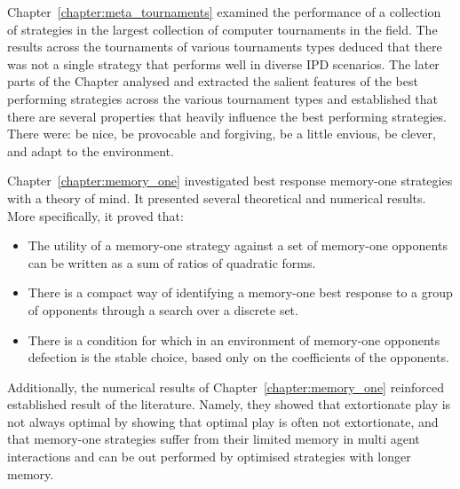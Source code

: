 Chapter~\ref{chapter:meta_tournaments} examined the performance of a collection
of \numberofstrategies strategies in the largest collection of computer
tournaments in the field. The results across the \numberofalltournaments
tournaments of various tournaments types deduced that there was not a single strategy that
performs well in diverse IPD scenarios.
The later parts of the Chapter analysed and extracted the salient features of the best
performing strategies across the various tournament types and established that there
are several properties that heavily influence the best performing
strategies. There were: be nice, be provocable and forgiving, be
a little envious, be clever, and adapt to the environment.

Chapter~\ref{chapter:memory_one} investigated best response memory-one
strategies with a theory of mind. It presented
several theoretical and numerical results. More specifically, it proved that:

\begin{itemize}
    \item The utility of a
    memory-one strategy against a set of memory-one opponents can be written as a
    sum of ratios of quadratic forms.
    \item There is a compact way of identifying
    a memory-one best response to a group of opponents through a search over a
    discrete set.
    \item There is a condition for which in an environment of
    memory-one opponents defection is the stable choice, based only on the
    coefficients of the opponents.
\end{itemize}

Additionally, the numerical results of Chapter~\ref{chapter:memory_one}
reinforced established result of the literature. Namely, they showed that
extortionate play is not always optimal by showing that optimal play is often
not extortionate, and that memory-one strategies suffer from their limited
memory in multi agent interactions and can be out performed by optimised
strategies with longer memory.

